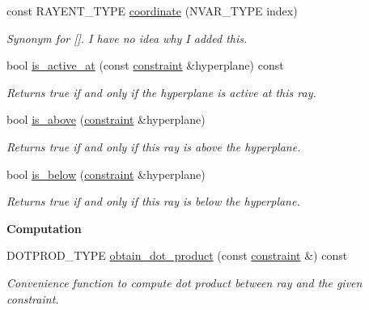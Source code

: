 \begin{Indent}
\begin{DoxyCompactItemize}
const R\+A\+Y\+E\+N\+T\+\_\+\+T\+Y\+PE \hyperlink{group___c_l_s_solvers_a785bb4f7649e9c3db1141fdde55834c0}{coordinate} (N\+V\+A\+R\+\_\+\+T\+Y\+PE index)
\begin{DoxyCompactList}\small\item\em Synonym for \mbox{[}\mbox{]}. I have no idea why I added this. \end{DoxyCompactList}\item 
bool \hyperlink{group___c_l_s_solvers_aa1831b718c9a91d786a1a578cb1cefea}{is\+\_\+active\+\_\+at} (const \hyperlink{group___c_l_s_solvers_classconstraint}{constraint} \&hyperplane) const
\begin{DoxyCompactList}\small\item\em Returns {\ttfamily true} if and only if the hyperplane is active at this ray. \end{DoxyCompactList}\item 
bool \hyperlink{group___c_l_s_solvers_a5d4113ea6249145c337f4d26a54eb940}{is\+\_\+above} (\hyperlink{group___c_l_s_solvers_classconstraint}{constraint} \&hyperplane)
\begin{DoxyCompactList}\small\item\em Returns {\ttfamily true} if and only if this ray is above the hyperplane. \end{DoxyCompactList}\item 
bool \hyperlink{group___c_l_s_solvers_a08f0af168bb0a86db612fdd3ce22045b}{is\+\_\+below} (\hyperlink{group___c_l_s_solvers_classconstraint}{constraint} \&hyperplane)
\begin{DoxyCompactList}\small\item\em Returns {\ttfamily true} if and only if this ray is below the hyperplane. \end{DoxyCompactList}\end{DoxyCompactItemize}
\end{Indent}
\begin{Indent}\textbf{ Computation}\par
\begin{DoxyCompactItemize}
\item 
D\+O\+T\+P\+R\+O\+D\+\_\+\+T\+Y\+PE \hyperlink{group___c_l_s_solvers_a25f56f0f7acafe000f98550af47b7da9}{obtain\+\_\+dot\+\_\+product} (const \hyperlink{group___c_l_s_solvers_classconstraint}{constraint} \&) const
\begin{DoxyCompactList}\small\item\em Convenience function to compute dot product between ray and the given constraint. \end{DoxyCompactList}\end{DoxyCompactItemize}
\end{Indent}
